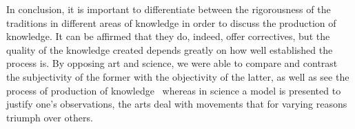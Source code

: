 \documentclass[12pt,a4paper]{article}
\begin{document}
In conclusion, it is important to differentiate between the rigorousness of the traditions in different areas of knowledge in order to discuss the production of knowledge. It can be affirmed that they do, indeed, offer correctives, but the quality of the knowledge created depends greatly on how well established the process is. By opposing art and science, we were able to compare and contrast the subjectivity of the former with the objectivity of the latter, as well as see the process of production of knowledge \textendash\ whereas in science a model is presented to justify one's observations, the arts deal with movements that for varying reasons triumph over others.


\end{document}
